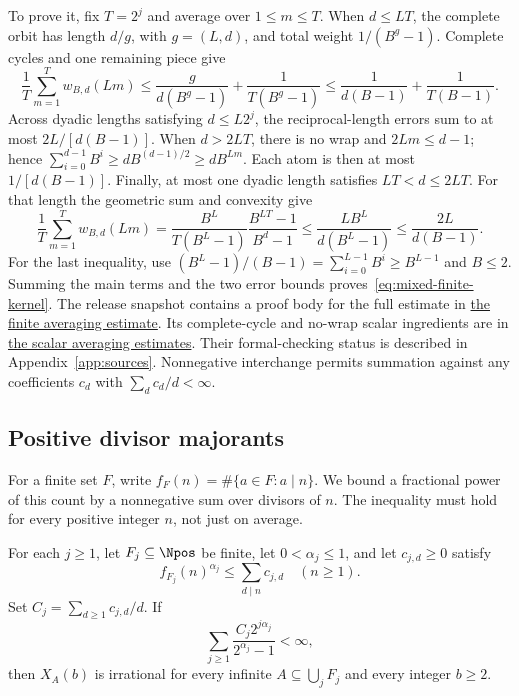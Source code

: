 \documentclass[11pt]{article}
\begin{document}
To prove it, fix $T=2^j$ and average over $1\le m\le T$.
When $d\le LT$, the complete orbit has length $d/g$, with $g=(L,d)$,
and total weight $1/(B^g-1)$.  Complete cycles and one remaining piece give
\[
 \frac1T\sum_{m=1}^T w_{B,d}(Lm)
 \le\frac{g}{d(B^g-1)}+\frac1{T(B^g-1)}
 \le\frac1{d(B-1)}+\frac1{T(B-1)}.
\]
Across dyadic lengths satisfying $d\le L2^j$, the reciprocal-length
errors sum to at most $2L/[d(B-1)]$.
When $d>2LT$, there is no wrap and $2Lm\le d-1$; hence
$\sum_{i=0}^{d-1}B^i\ge dB^{(d-1)/2}\ge dB^{Lm}$.
Each atom is then at most $1/[d(B-1)]$.
Finally, at most one dyadic length satisfies $LT<d\le2LT$.
For that length the geometric sum and convexity give
\[
 \frac1T\sum_{m=1}^T w_{B,d}(Lm)
 =\frac{B^L}{T(B^L-1)}\frac{B^{LT}-1}{B^d-1}
 \le\frac{LB^L}{d(B^L-1)}
 \le\frac{2L}{d(B-1)}.
\]
For the last inequality, use
$(B^L-1)/(B-1)=\sum_{i=0}^{L-1}B^i\ge B^{L-1}$ and $B\le2$.
Summing the main terms and the two error bounds proves~\eqref{eq:mixed-finite-kernel}.
The release snapshot contains a proof body for the full estimate in
\href{https://github.com/wcook04/plectis-erdos-lean/blob/52f29ad173b04e3bac941b3663f2b9aebe5de0bb/ErdosProblems/Erdos257/PaperCompleteR8/DyadicKernel.lean#L207}{the finite averaging estimate}.
Its complete-cycle and no-wrap scalar ingredients are in
\href{https://github.com/wcook04/plectis-erdos-lean/blob/52f29ad173b04e3bac941b3663f2b9aebe5de0bb/ErdosProblems/Erdos257/PaperCompleteR7/CoverKernel.lean#L130}{the scalar averaging estimates}.
Their formal-checking status is described in Appendix~\ref{app:sources}.
Nonnegative interchange permits summation against any coefficients $c_d$
with $\sum_dc_d/d<\infty$.

\subsection{Positive divisor majorants}
For a finite set $F$, write $f_F(n)=\#\{a\in F:a\mid n\}$.
We bound a fractional power of this count by a nonnegative sum over
divisors of $n$.  The inequality must hold for every positive integer
$n$, not just on average.

\begin{theorem}\label{thm:variable-fractional-cover}
For each $j\ge1$, let $F_j\subseteq\Npos$ be finite, let
$0<\alpha_j\le1$, and let $c_{j,d}\ge0$ satisfy
\[
 f_{F_j}(n)^{\alpha_j}\le\sum_{d\mid n}c_{j,d}\quad(n\ge1).
\]
Set $C_j=\sum_{d\ge1}c_{j,d}/d$.  If
\begin{equation*}
 \sum_{j\ge1}\frac{C_j2^{j\alpha_j}}{2^{\alpha_j}-1}<\infty,
 \tag{V}\label{eq:strengthened-cover}
\end{equation*}
then $X_A(b)$ is irrational for every infinite
$A\subseteq\bigcup_jF_j$ and every integer $b\ge2$.
\end{theorem}
\end{document}

